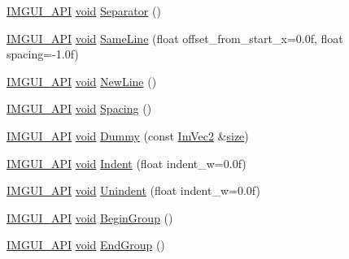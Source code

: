 \begin{DoxyCompactItemize}
\hyperlink{imgui_8h_a43829975e84e45d1149597467a14bbf5}{I\+M\+G\+U\+I\+\_\+\+A\+PI} \hyperlink{imgui__impl__opengl3__loader_8h_ac668e7cffd9e2e9cfee428b9b2f34fa7}{void} \hyperlink{namespaceImGui_a191123597a5084d003c8beac7eeb029e}{Separator} ()
\item 
\hyperlink{imgui_8h_a43829975e84e45d1149597467a14bbf5}{I\+M\+G\+U\+I\+\_\+\+A\+PI} \hyperlink{imgui__impl__opengl3__loader_8h_ac668e7cffd9e2e9cfee428b9b2f34fa7}{void} \hyperlink{namespaceImGui_a2991c91e94f3b77a0c3411f4f3aa348e}{Same\+Line} (float offset\+\_\+from\+\_\+start\+\_\+x=0.\+0f, float spacing=-\/1.\+0f)
\item 
\hyperlink{imgui_8h_a43829975e84e45d1149597467a14bbf5}{I\+M\+G\+U\+I\+\_\+\+A\+PI} \hyperlink{imgui__impl__opengl3__loader_8h_ac668e7cffd9e2e9cfee428b9b2f34fa7}{void} \hyperlink{namespaceImGui_a77f8b0a33e5335f98661f99e720411da}{New\+Line} ()
\item 
\hyperlink{imgui_8h_a43829975e84e45d1149597467a14bbf5}{I\+M\+G\+U\+I\+\_\+\+A\+PI} \hyperlink{imgui__impl__opengl3__loader_8h_ac668e7cffd9e2e9cfee428b9b2f34fa7}{void} \hyperlink{namespaceImGui_a2659e2bfe84b4cad0facd65d5c1ac90d}{Spacing} ()
\item 
\hyperlink{imgui_8h_a43829975e84e45d1149597467a14bbf5}{I\+M\+G\+U\+I\+\_\+\+A\+PI} \hyperlink{imgui__impl__opengl3__loader_8h_ac668e7cffd9e2e9cfee428b9b2f34fa7}{void} \hyperlink{namespaceImGui_a8b0fb07113251301ff897b8578a53f34}{Dummy} (const \hyperlink{structImVec2}{Im\+Vec2} \&\hyperlink{imgui__impl__opengl3__loader_8h_a3d1e3edfcf61ca2d831883e1afbad89e}{size})
\item 
\hyperlink{imgui_8h_a43829975e84e45d1149597467a14bbf5}{I\+M\+G\+U\+I\+\_\+\+A\+PI} \hyperlink{imgui__impl__opengl3__loader_8h_ac668e7cffd9e2e9cfee428b9b2f34fa7}{void} \hyperlink{namespaceImGui_a6c7b9f2d60951462eeebad80154a8926}{Indent} (float indent\+\_\+w=0.\+0f)
\item 
\hyperlink{imgui_8h_a43829975e84e45d1149597467a14bbf5}{I\+M\+G\+U\+I\+\_\+\+A\+PI} \hyperlink{imgui__impl__opengl3__loader_8h_ac668e7cffd9e2e9cfee428b9b2f34fa7}{void} \hyperlink{namespaceImGui_ad577d36753634c9bbdc3750b0e5217f5}{Unindent} (float indent\+\_\+w=0.\+0f)
\item 
\hyperlink{imgui_8h_a43829975e84e45d1149597467a14bbf5}{I\+M\+G\+U\+I\+\_\+\+A\+PI} \hyperlink{imgui__impl__opengl3__loader_8h_ac668e7cffd9e2e9cfee428b9b2f34fa7}{void} \hyperlink{namespaceImGui_a42407e196b7ed2a8755bff28aae9805f}{Begin\+Group} ()
\item 
\hyperlink{imgui_8h_a43829975e84e45d1149597467a14bbf5}{I\+M\+G\+U\+I\+\_\+\+A\+PI} \hyperlink{imgui__impl__opengl3__loader_8h_ac668e7cffd9e2e9cfee428b9b2f34fa7}{void} \hyperlink{namespaceImGui_a05fc97fc64f28a55486087f503d9a622}{End\+Group} ()

\end{DoxyCompactItemize}

